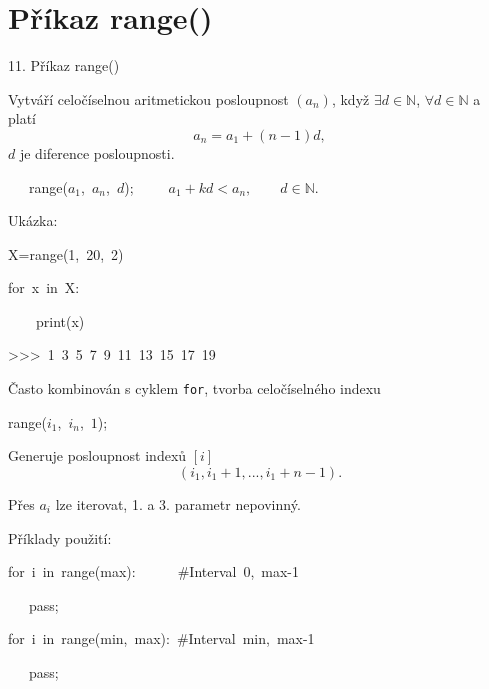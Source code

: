\documentclass[czech]{beamer}
\newenvironment{lyxcode}
  {\par\begin{list}{}{
    \setlength{\rightmargin}{\leftmargin}
    \setlength{\listparindent}{0pt}%
    \raggedright
    \setlength{\itemsep}{0pt}
    \setlength{\parsep}{0pt}
    \normalfont\ttfamily}%
   \def\{{\char`\{}
   \def\}{\char`\}}
   \def\textasciitilde{\char`\~}
   \item[]}
  {\end{list}}
\begin{document}
\section{Příkaz range()}
\begin{frame}[plain]{11. Příkaz range()}

{\footnotesize Vytváří celočíselnou aritmetickou posloupnost $(a_{n})$,
když $\exists d\in\mathbb{N}$, $\forall d\in\mathbb{N}$ a platí
\[
a_{n}=a_{1}+(n-1)d,
\]
$d$ je diference posloupnosti.}{\footnotesize\par}
\begin{lyxcode}
{\footnotesize ~~~range($a_{1}$,~}{\footnotesize\textrm{$a_{n}$}}{\footnotesize ,~$d$);~~~~~$a_{1}+kd<a_{n},\qquad d\in\mathbb{N}.$}{\footnotesize\par}
\end{lyxcode}
{\footnotesize Ukázka:}{\footnotesize\par}
\begin{lyxcode}
{\footnotesize X=range(1,~20,~2)}{\footnotesize\par}

{\footnotesize for~x~in~X:~~~}{\footnotesize\par}

{\footnotesize ~~~~print(x)}{\footnotesize\par}

{\footnotesize >\textcompwordmark >\textcompwordmark >~1~3~5~7~9~11~13~15~17~19}{\footnotesize\par}
\end{lyxcode}
{\footnotesize Často kombinován s cyklem }{\footnotesize\texttt{for}}{\footnotesize ,
tvorba celočíselného indexu}{\footnotesize\par}
\begin{lyxcode}
{\footnotesize range($i_{1}$,~}{\footnotesize\textrm{$i_{n}$}}{\footnotesize ,~$1$);~}{\footnotesize\par}
\end{lyxcode}
{\footnotesize Generuje posloupnost indexů $[i]$
\[
(i_{1},i_{1}+1,...,i_{1}+n-1).
\]
}{\footnotesize\par}

{\footnotesize Přes $a_{i}$ lze iterovat, 1. a 3. parametr nepovinný.\medskip{}
}{\footnotesize\par}

{\footnotesize Příklady použití:}{\footnotesize\par}
\begin{lyxcode}
{\footnotesize for~i~in~range(max):~~~~~~\#Interval~0,~max-1}{\footnotesize\par}

{\footnotesize ~~~pass;}{\footnotesize\par}

{\footnotesize for~i~in~range(min,~max):~\#Interval~min,~max-1}{\footnotesize\par}

{\footnotesize ~~~pass;}{\footnotesize\par}
\end{lyxcode}
\end{frame}
\end{document}
